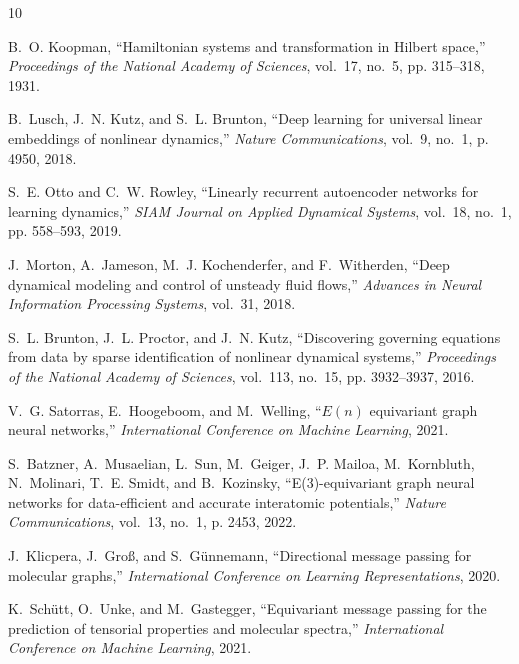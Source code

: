 \documentclass{article}
\begin{document}
\begin{thebibliography}{10}

B.~O. Koopman, ``Hamiltonian systems and transformation in {H}ilbert space,''
  \emph{Proceedings of the National Academy of Sciences}, vol.~17, no.~5, pp.
  315--318, 1931.

B.~Lusch, J.~N. Kutz, and S.~L. Brunton, ``Deep learning for universal linear
  embeddings of nonlinear dynamics,'' \emph{Nature Communications}, vol.~9,
  no.~1, p. 4950, 2018.

S.~E. Otto and C.~W. Rowley, ``Linearly recurrent autoencoder networks for
  learning dynamics,'' \emph{SIAM Journal on Applied Dynamical Systems},
  vol.~18, no.~1, pp. 558--593, 2019.

J.~Morton, A.~Jameson, M.~J. Kochenderfer, and F.~Witherden, ``Deep dynamical
  modeling and control of unsteady fluid flows,'' \emph{Advances in Neural
  Information Processing Systems}, vol.~31, 2018.

S.~L. Brunton, J.~L. Proctor, and J.~N. Kutz, ``Discovering governing equations
  from data by sparse identification of nonlinear dynamical systems,''
  \emph{Proceedings of the National Academy of Sciences}, vol.~113, no.~15, pp.
  3932--3937, 2016.

V.~G. Satorras, E.~Hoogeboom, and M.~Welling, ``{$E(n)$} equivariant graph
  neural networks,'' \emph{International Conference on Machine Learning}, 2021.

S.~Batzner, A.~Musaelian, L.~Sun, M.~Geiger, J.~P. Mailoa, M.~Kornbluth,
  N.~Molinari, T.~E. Smidt, and B.~Kozinsky, ``E(3)-equivariant graph neural
  networks for data-efficient and accurate interatomic potentials,''
  \emph{Nature Communications}, vol.~13, no.~1, p. 2453, 2022.

J.~Klicpera, J.~Gro{\ss}, and S.~G{\"u}nnemann, ``Directional message passing
  for molecular graphs,'' \emph{International Conference on Learning
  Representations}, 2020.

K.~Sch{\"u}tt, O.~Unke, and M.~Gastegger, ``Equivariant message passing for the
  prediction of tensorial properties and molecular spectra,''
  \emph{International Conference on Machine Learning}, 2021.


\end{thebibliography}
\end{document}
